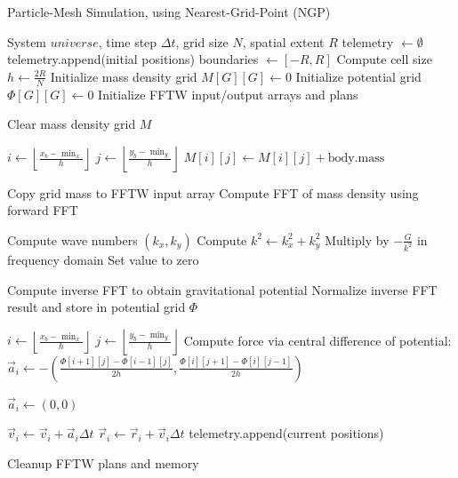 \documentclass{article}
\begin{document}
\begin{algorithm}[H]
\caption{Particle-Mesh Simulation, using Nearest-Grid-Point (NGP)}
\begin{algorithmic}[1]
\Require System $universe$, time step $\Delta t$, grid size $N$, spatial extent $R$
\State telemetry $\gets \emptyset$
\State telemetry.append(initial positions)
\State boundaries $\gets [-R, R]$
\State Compute cell size $h \gets \frac{2R}{N}$
\State Initialize mass density grid $M[G][G] \gets 0$
\State Initialize potential grid $\Phi[G][G] \gets 0$
\State Initialize FFTW input/output arrays and plans

    \State Clear mass density grid $M$

        \State $i \gets \left\lfloor \frac{x_b - \min_x}{h} \right\rfloor$
        \State $j \gets \left\lfloor \frac{y_b - \min_y}{h} \right\rfloor$        
            \State $M[i][j] \gets M[i][j] + \text{body.mass}$
        \EndIf
    \EndFor

    \State Copy grid mass to FFTW input array
    \State Compute FFT of mass density using forward FFT

        \State Compute wave numbers $(k_x, k_y)$
        \State Compute $k^2 \gets k_x^2 + k_y^2$
            \State Multiply by $-\frac{G}{k^2}$ in frequency domain
        \Else
            \State Set value to zero
        \EndIf
    \EndFor

    \State Compute inverse FFT to obtain gravitational potential
    \State Normalize inverse FFT result and store in potential grid $\Phi$

        \State $i \gets \left\lfloor \frac{x_b - \min_x}{h} \right\rfloor$
        \State $j \gets \left\lfloor \frac{y_b - \min_y}{h} \right\rfloor$
           \State Compute force via central difference of potential:
            \State $\vec{a}_i \gets -\left( \frac{\Phi[i+1][j] - \Phi[i-1][j]}{2h}, \frac{\Phi[i][j+1] - \Phi[i][j-1]}{2h} \right)$

        \Else
            \State $\vec{a}_i \gets (0, 0)$
        \EndIf
    \EndFor

        \State $\vec{v}_i \gets \vec{v}_i + \vec{a}_i \Delta t$ 
        \State $\vec{r}_i \gets \vec{r}_i + \vec{v}_i \Delta t$ 
    \EndFor
    \State telemetry.append(current positions)
\EndFor

\State Cleanup FFTW plans and memory
\end{algorithmic}
\end{algorithm}
\end{document}
